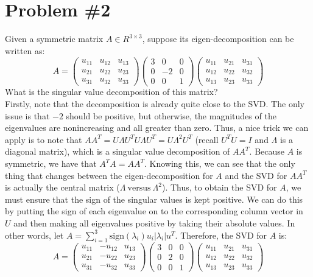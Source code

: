 \documentclass[12pt]{article}
\begin{document}
	\section*{Problem \#2}
	Given a symmetric matrix $A \in R^{3\times 3}$, suppose its eigen-decomposition can be written as:
	\begin{equation*}
		A =
		\left(
		\begin{array}{ccc}
		u_{11} & u_{12} & u_{13} \\
		u_{21} & u_{22} & u_{23} \\
		u_{31} & u_{32} & u_{33}
		\end{array}
		\right)
		\left(
		\begin{array}{ccc}
		3 & 0 & 0 \\
		0 & -2 & 0 \\
		0 & 0 & 1
		\end{array}
		\right)
		\left(
		\begin{array}{ccc}
		u_{11} & u_{21} & u_{31} \\
		u_{12} & u_{22} & u_{32} \\
		u_{13} & u_{23} & u_{33}
		\end{array}
		\right)
	\end{equation*}
	What is the singular value decomposition of this matrix?
	\\
	Firstly, note that the decomposition is already quite close to the SVD. The only issue is that $-2$ should be positive, but otherwise, the magnitudes of the eigenvalues are nonincreasing and all greater than zero. Thus, a nice trick we can apply is to note that $AA^T=U\Lambda U^T U\Lambda U^T = U \Lambda^2 U^T$ (recall $U^T U = I$ and $\Lambda$ is a diagonal matrix), which is a singular value decomposition of $A A^T$. Because $A$ is symmetric, we have that $A^T A = AA^T$. Knowing this, we can see that the only thing that changes between the eigen-decomposition for $A$ and the SVD for $A A^T$ is actually the central matrix ($\Lambda \ \text{versus}\  \Lambda^2$). Thus, to obtain the SVD for $A$, we must ensure that the sign of the singular values is kept positive. We can do this by putting the sign of each eigenvalue on to the corresponding column vector in $U$ and then making all eigenvalues positive by taking their absolute values. In other words, let $A=\sum_{i=1}^{3}\text{sign}(\lambda_i)u_i |\lambda_i|u^T$.
	Therefore, the SVD for $A$ is:
	\begin{equation*}
	A =
	\left(
	\begin{array}{ccc}
	u_{11} & -u_{12} & u_{13} \\
	u_{21} & -u_{22} & u_{23} \\
	u_{31} & -u_{32} & u_{33}
	\end{array}
	\right)
	\left(
	\begin{array}{ccc}
	3 & 0 & 0 \\
	0 & 2 & 0 \\
	0 & 0 & 1
	\end{array}
	\right)
	\left(
	\begin{array}{ccc}
	u_{11} & u_{21} & u_{31} \\
	u_{12} & u_{22} & u_{32} \\
	u_{13} & u_{23} & u_{33}
	\end{array}
	\right)
	\end{equation*}
\end{document}
